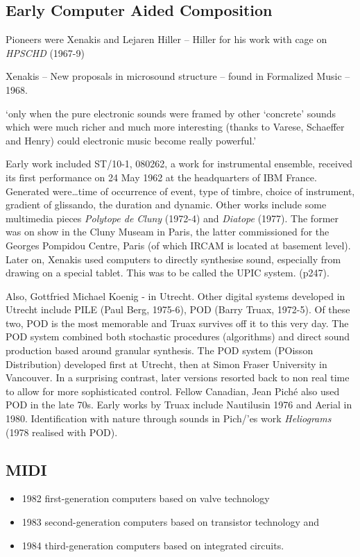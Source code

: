 \subsection{Early Computer Aided Composition} 
Pioneers were Xenakis and Lejaren Hiller – Hiller for his work with cage on \textit{HPSCHD} (1967-9)

Xenakis – New proposals in microsound structure – found in Formalized Music – 1968.

`only when the pure electronic sounds were framed by other `concrete' sounds which were much richer and much more interesting (thanks to Varese, Schaeffer and Henry) could electronic music become really powerful.'


Early work included ST/10-1, 080262, a work for instrumental ensemble, received its first performance on 24 May 1962 at the headquarters of IBM France.  Generated were…time of occurrence of event, type of timbre, choice of instrument, gradient of glissando, the duration and dynamic. Other works include some multimedia pieces \textit{Polytope de Cluny} (1972-4) and \textit{Diatope} (1977).  The former was on show in the Cluny Museam in Paris, the latter commissioned for the Georges Pompidou Centre, Paris (of which IRCAM is located at basement level).  Later on, Xenakis used computers to directly synthesise sound, especially from drawing on a special tablet.  This was to be called the UPIC system. (p247).


Also, Gottfried Michael Koenig - in Utrecht.  Other digital systems developed in Utrecht include PILE (Paul Berg, 1975-6), POD  (Barry Truax,  1972-5).  Of these two, POD is the most memorable and Truax survives off it to this very day. The POD system combined both stochastic procedures (algorithms) and direct sound production based around granular synthesis. The POD system (POisson Distribution) developed first at Utrecht, then at Simon Fraser University in Vancouver. In a surprising contrast, later versions resorted back to non real time to allow for more sophisticated control.  Fellow Canadian, Jean Pich\'e also used POD in the late 70s. Early works by Truax include Nautilusin 1976 and Aerial in 1980. Identification with nature through sounds in Pich/'es work \textit{Heliograms} (1978 realised with POD).



\subsection{MIDI}
\begin{itemize}
\item 1982 first-generation computers based on valve technology
\item 1983 second-generation computers based on transistor technology and
\item 1984 third-generation computers based on integrated circuits.
\end{itemize}

